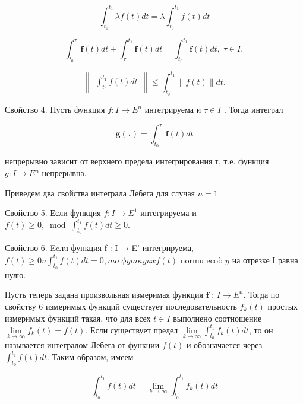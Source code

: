 \documentclass[8pt]{extarticle}
\begin{document}
\[
{\int }_{{t}_{0}}^{{t}_{1}}{\lambda f}\left( t\right) {dt} = \lambda {\int }_{{t}_{0}}^{{t}_{1}}f\left( t\right) {dt}
\]

\[
{\int }_{{t}_{0}}^{\tau }\mathbf{f}\left( t\right) {dt} + {\int }_{\tau }^{{t}_{1}}\mathbf{f}\left( t\right) {dt} = {\int }_{{t}_{0}}^{{t}_{1}}\mathbf{f}\left( t\right) {dt},\;\tau  \in  I,
\]

\[
\left\lVert \begin{array}{c} {{\int }_{{t}_{0}}^{{t}_{1}}f\left( t\right) {dt}} \end{array} \right\rVert \leq  {\int }_{{t}_{0}}^{{t}_{1}}\parallel f\left( t\right) \parallel {dt}.
\]

Свойство 4. Пусть функция \(f : I \rightarrow  {E}^{n}\) интегрируема и \(\tau  \in  I\) . Тогда интеграл

\[
\mathbf{g}\left( \tau \right)  = {\int }_{{t}_{0}}^{\tau }\mathbf{f}\left( t\right) {dt}
\]

непрерывно зависит от верхнего предела интегрирования τ, т.е. функция \(g : I \rightarrow  {E}^{n}\) непрерывна.

Приведем два свойства интеграла Лебега для случая \(n = 1\) .

Свойство 5. Если функция \(f : I \rightarrow  {E}^{1}\) интегрируема и \(f\left( t\right)  \geq  0,{\;\operatorname{mod}\;{\int }_{{t}_{0}}^{{t}_{1}}}f\left( t\right) {dt} \geq  0.\)

Свойство 6. Ecлu функция f : I → E' интегрируема, \(f\left( t\right)  \geq  {0u}{\int }_{{t}_{0}}^{{t}_{1}}f\left( t\right) {dt} = 0,{mo}\;{\phi y}m{\kappa {yux}}f\left( t\right)\) normu ecoò \(y\) на отрезке I равна нулю.

\fi

Пусть теперь задана произвольная измеримая функция \(\mathbf{f}\) : \(I \rightarrow  {E}^{n}\). Тогда по свойству 6 измеримых функций существует последовательность \({f}_{k}\left( t\right)\) простых измеримых функций такая, что для всех \(t \in  I\) выполнено соотношение \(\mathop{\lim }\limits_{{k \rightarrow  \infty }}{f}_{k}\left( t\right)  = f\left( t\right)\). Если существует предел \(\mathop{\lim }\limits_{{k \rightarrow  \infty }}{\int }_{{t}_{0}}^{{t}_{1}}{f}_{k}\left( t\right) {dt}\), то он называется интегралом Лебега от функции \(f\left( t\right)\) и обозначается через \({\int }_{{t}_{0}}^{{t}_{1}}f\left( t\right) {dt}\). Таким образом, имеем

\[
{\int }_{{t}_{0}}^{{t}_{1}}f\left( t\right) {dt} = \mathop{\lim }\limits_{{k \rightarrow  \infty }}{\int }_{{t}_{0}}^{{t}_{1}}{f}_{k}\left( t\right) {dt}
\]
\end{document}
